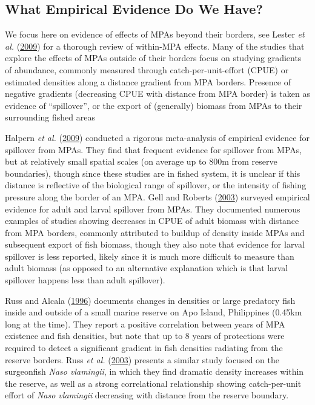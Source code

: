 \documentclass[twoside,12pt,final]{ucthesis-CA2012}
\begin{document}
\begin{ucmainmatter}
\subsection{What Empirical Evidence Do We
Have?}\label{what-empirical-evidence-do-we-have}

We focus here on evidence of effects of MPAs beyond their borders, see
Lester \emph{et al.} (\protect\hyperlink{ref-Lester2009}{2009}) for a
thorough review of within-MPA effects. Many of the studies that explore
the effects of MPAs outside of their borders focus on studying gradients
of abundance, commonly measured through catch-per-unit-effort (CPUE) or
estimated densities along a distance gradient from MPA borders. Presence
of negative gradients (decreasing CPUE with distance from MPA border) is
taken as evidence of ``spillover'', or the export of (generally) biomass
from MPAs to their surrounding fished areas

Halpern \emph{et al.} (\protect\hyperlink{ref-Halpern2009}{2009})
conducted a rigorous meta-analysis of empirical evidence for spillover
from MPAs. They find that frequent evidence for spillover from MPAs, but
at relatively small spatial scales (on average up to 800m from reserve
boundaries), though since these studies are in fished system, it is
unclear if this distance is reflective of the biological range of
spillover, or the intensity of fishing pressure along the border of an
MPA. Gell and Roberts (\protect\hyperlink{ref-Gell2003}{2003}) surveyed
empirical evidence for adult and larval spillover from MPAs. They
documented numerous examples of studies showing decreases in CPUE of
adult biomass with distance from MPA borders, commonly attributed to
buildup of density inside MPAs and subsequent export of fish biomass,
though they also note that evidence for larval spillover is less
reported, likely since it is much more difficult to measure than adult
biomass (as opposed to an alternative explanation which is that larval
spillover happens less than adult spillover).

Russ and Alcala (\protect\hyperlink{ref-Russ1996}{1996}) documents
changes in densities or large predatory fish inside and outside of a
small marine reserve on Apo Island, Philippines (0.45km long at the
time). They report a positive correlation between years of MPA existence
and fish densities, but note that up to 8 years of protections were
required to detect a significant gradient in fish densities radiating
from the reserve borders. Russ \emph{et al.}
(\protect\hyperlink{ref-Russ2003a}{2003}) presents a similar study
focused on the surgeonfish \emph{Naso vlamingii}, in which they find
dramatic density increases within the reserve, as well as a strong
correlational relationship showing catch-per-unit effort of \emph{Naso
vlamingii} decreasing with distance from the reserve boundary.


\end{ucmainmatter}
\end{document}
